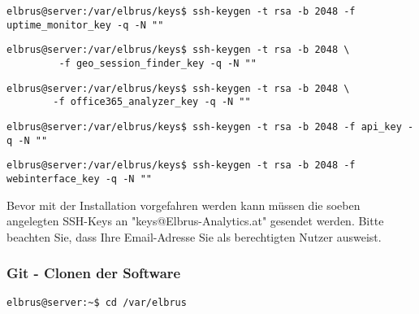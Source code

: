 \documentclass{article}
\begin{document}
	\lstset{style=commands}
	\begin{lstlisting}[caption={Erstellen des SSH-keys der für das Herunterladen des 'Uptime-Monitors' benötigt wird.}]
		elbrus@server:/var/elbrus/keys$ ssh-keygen -t rsa -b 2048 -f uptime_monitor_key -q -N ""
	\end{lstlisting}
	
	\lstset{style=commands}
	\begin{lstlisting}[caption={Erstellen des SSH-keys der für das Herunterladen des 'geo session finders' benötigt wird.}]
		elbrus@server:/var/elbrus/keys$ ssh-keygen -t rsa -b 2048 \
		 -f geo_session_finder_key -q -N ""
	\end{lstlisting}

	\lstset{style=commands}
	\begin{lstlisting}[caption={Erstellen des SSH-keys der für das Herunterladen des 'office365 analyzers' benötigt wird.}]
		elbrus@server:/var/elbrus/keys$ ssh-keygen -t rsa -b 2048 \
		-f office365_analyzer_key -q -N ""
	\end{lstlisting}
	
	\lstset{style=commands}
	\begin{lstlisting}[caption={Erstellen des SSH-keys der für das Herunterladen der 'API' benötigt wird.}]
		elbrus@server:/var/elbrus/keys$ ssh-keygen -t rsa -b 2048 -f api_key -q -N ""
	\end{lstlisting}
	
	\lstset{style=commands}
	\begin{lstlisting}[caption={Erstellen des SSH-keys der für das Herunterladen des 'Webinterfaces' benötigt wird.}]
		elbrus@server:/var/elbrus/keys$ ssh-keygen -t rsa -b 2048 -f webinterface_key -q -N ""
	\end{lstlisting}

	Bevor mit der Installation vorgefahren werden kann müssen die soeben angelegten SSH-Keys an "keys@Elbrus-Analytics.at" gesendet werden. Bitte beachten Sie, dass Ihre Email-Adresse Sie als berechtigten Nutzer ausweist.
	
	\subsubsection{Git - Clonen der Software}

	\lstset{style=commands}
	\begin{lstlisting}[caption={Wechseln des Verzeichnisses.}]
		elbrus@server:~$ cd /var/elbrus
	\end{lstlisting}
	
\end{document}

